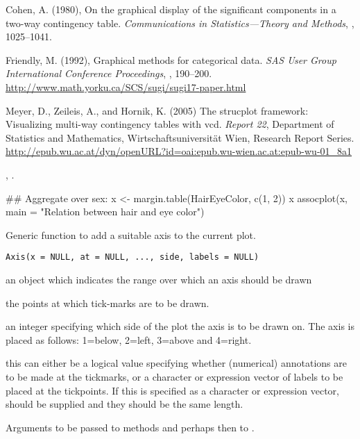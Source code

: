 \begin{References}\relax
Cohen, A. (1980),
On the graphical display of the significant components in a two-way
contingency table.
\emph{Communications in Statistics---Theory and Methods}, ,
1025--1041.

Friendly, M. (1992),
Graphical methods for categorical data.
\emph{SAS User Group International Conference Proceedings}, ,
190--200.
\url{http://www.math.yorku.ca/SCS/sugi/sugi17-paper.html}

Meyer, D., Zeileis, A., and Hornik, K. (2005)
The strucplot framework: Visualizing multi-way contingency tables with vcd.
\emph{Report 22}, Department of Statistics and Mathematics, 
Wirtschaftsuniversität Wien, Research Report Series.
\url{http://epub.wu.ac.at/dyn/openURL?id=oai:epub.wu-wien.ac.at:epub-wu-01_8a1}
\end{References}
%
\begin{SeeAlso}\relax
{}, .
\end{SeeAlso}
%
\begin{Examples}
\begin{ExampleCode}
## Aggregate over sex:
x <- margin.table(HairEyeColor, c(1, 2))
x
assocplot(x, main = "Relation between hair and eye color")
\end{ExampleCode}
\end{Examples}
%
\begin{Description}\relax
Generic function to add a suitable axis to the current plot.
\end{Description}
%
\begin{Usage}
\begin{verbatim}
Axis(x = NULL, at = NULL, ..., side, labels = NULL)
\end{verbatim}
\end{Usage}
%
\begin{Arguments}
\begin{ldescription}
\item[\code{x}] an object which indicates the range over which an axis should
be drawn
\item[\code{at}] the points at which tick-marks are to be drawn.
\item[\code{side}] an integer specifying which side of the plot the axis is
to be drawn on.  The axis is placed as follows: 1=below,
2=left, 3=above and 4=right.
\item[\code{labels}] this can either be a logical value specifying whether
(numerical) annotations are to be made at the tickmarks, or a
character or expression vector of labels to be placed at the
tickpoints. If this is specified as a character or expression
vector,  should be supplied and they should be the same
length.
\item[\code{...}] Arguments to be passed to methods and perhaps then to
.
\end{ldescription}
\end{Arguments}
